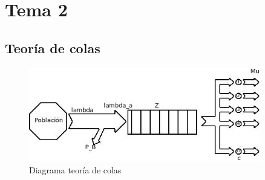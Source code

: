 \section{Tema 2}
\subsection{Teoría de colas}
\begin{figure}[H]
\centering
\includegraphics[width=0.9\textwidth]{Imagen/diateocolas.jpg}
\caption{Diagrama teoría de colas}
\label{dia:teocolas}
\end{figure}

